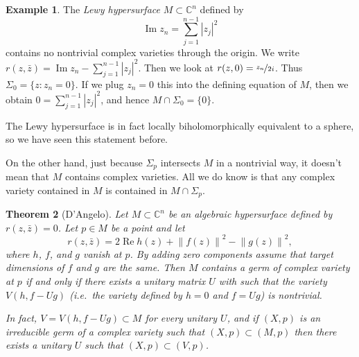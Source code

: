 \documentclass[12pt,openany]{book}
\renewcommand{\Re}{\operatorname{Re}}
\renewcommand{\Im}{\operatorname{Im}}
\newcommand{\abs}[1]{\left\lvert {#1} \right\rvert}
\newcommand{\norm}[1]{\left\lVert {#1} \right\rVert}
\newcommand{\C}{{\mathbb{C}}}
\newcommand{\myindex}[1]{#1\index{#1}}
\theoremstyle{plain}
\newtheorem{thm}{Theorem}[section]
\theoremstyle{remark}
\theoremstyle{definition}
\theoremstyle{exercise}
\theoremstyle{example}
\newtheorem{example}[thm]{Example}
\begin{document}
\begin{example}
The \emph{\myindex{Lewy hypersurface}} $M \subset \C^n$ defined by
\begin{equation}
\Im z_n = \sum_{j=1}^{n-1} \abs{z_j}^2
\end{equation}
contains no nontrivial complex varieties through the origin.
We write
$r(z,\bar{z}) = \Im z_n - \sum_{j=1}^{n-1} \abs{z_j}^2$.  Then we look
at $r(z,0) = \nicefrac{z_n}{2i}$.  Thus
$\Sigma_0 = \{ z : z_n = 0 \}$.  If we plug $z_n = 0$
this into the defining equation of $M$,
then we obtain
$0 = \sum_{j=1}^{n-1} \abs{z_j}^2$, and hence $M \cap \Sigma_0 = \{ 0 \}$.

The Lewy hypersurface is in fact locally biholomorphically
equivalent to a sphere, so we have seen this statement
before.
\end{example}

On the other hand, just because $\Sigma_p$ intersects $M$ in a nontrivial
way,
it
doesn't mean that $M$ contains complex varieties.  All we do know is that 
any complex variety contained in $M$ is contained in $M \cap
\Sigma_p$.

\begin{thm}[D'Angelo] \label{theorem:algcplxinm}
Let $M \subset \C^n$ be an algebraic hypersurface defined by $r(z,\bar{z}) =
0$.  Let $p \in M$ be a point and let
\begin{equation}
r(z,\bar{z}) = 2 \Re h(z) + \norm{f(z)}^2-\norm{g(z)}^2 ,
\end{equation}
where $h$, $f$, and $g$ vanish at $p$.  By adding zero components
assume that target dimensions of $f$ and $g$ are the same.
Then $M$ contains a germ of complex
variety at $p$
if and only if there exists a unitary matrix $U$ with such that
the variety $V(h,f-Ug)$ (i.e.\ the variety defined by $h=0$ and $f=Ug$)
is nontrivial.

In fact, $V=V(h,f-Ug) \subset M$ for every unitary $U$, and if $(X,p)$
is an irreducible germ of a complex variety such that $(X,p) \subset (M,p)$
then there exists a unitary $U$ such that $(X,p) \subset (V,p)$.
\end{thm}
\end{document}
